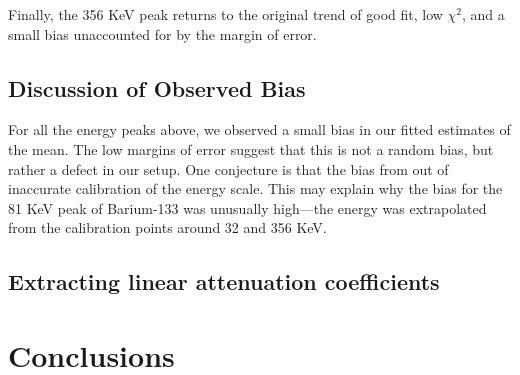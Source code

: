 \documentclass[12pt, letterpaper]{article}
\begin{document}
Finally, the 356 KeV peak returns to the original trend of good fit, low $\chi^2$, and a small bias unaccounted for by the margin of error. 

\subsection{Discussion of Observed Bias}

For all the energy peaks above, we observed a small bias in our fitted estimates of the mean. The low margins of error suggest that this is not a random bias, but rather a defect in our setup. One conjecture is that the bias from out of inaccurate calibration of the energy scale. This may explain why the bias for the 81 KeV peak of Barium-133 was unusually high—the energy was extrapolated from the calibration points around 32 and 356 KeV. 

\subsection{Extracting linear attenuation coefficients}

\section{Conclusions}
\end{document}
